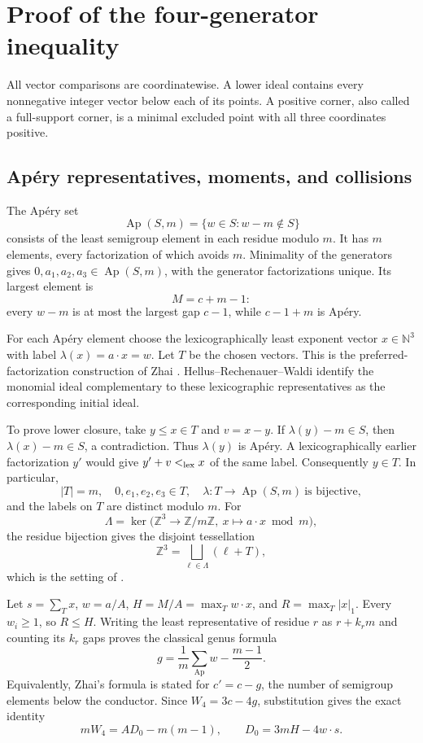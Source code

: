 \section{Proof of the four-generator inequality}\label{sec:proof}

All vector comparisons are coordinatewise. A lower ideal contains every
nonnegative integer vector below each of its points. A positive corner,
also called a full-support corner, is a minimal excluded point with all
three coordinates positive.

\subsection{Apéry representatives, moments, and collisions}\label{sec:p1}

The Apéry set
\[
\operatorname{Ap}(S,m)=\{w\in S:w-m\notin S\}
\]
consists of the least semigroup element in each residue modulo \(m\).
It has \(m\) elements, every factorization of which avoids \(m\).
Minimality of the generators gives \(0,a_1,a_2,a_3\in\operatorname{Ap}(S,m)\),
with the generator factorizations unique. Its largest element is
\[
M=c+m-1:
\]
every \(w-m\) is at most the largest gap \(c-1\), while \(c-1+m\) is Apéry.

For each Apéry element choose the lexicographically least exponent vector
\(x\in\mathbb N^3\) with label \(\lambda(x)=a\cdot x=w\).
Let \(T\) be the chosen vectors. This is the preferred-factorization
construction of Zhai \cite{Z}. Hellus--Rechenauer--Waldi
\cite[Proposition~2.3]{HRW} identify the monomial ideal complementary to
these lexicographic representatives as the corresponding initial ideal.

To prove lower closure, take \(y\le x\in T\) and \(v=x-y\).
If \(\lambda(y)-m\in S\), then \(\lambda(x)-m\in S\), a contradiction.
Thus \(\lambda(y)\) is Apéry. A lexicographically earlier factorization
\(y'\) would give \(y'+v<_{\rm lex}x\) of the same label. Consequently
\(y\in T\). In particular,
\[
|T|=m,\quad 0,e_1,e_2,e_3\in T,\quad
\lambda:T\longrightarrow\operatorname{Ap}(S,m)
\ \text{is bijective},
\]
and the labels on \(T\) are distinct modulo \(m\).
For
\[
\Lambda=\ker\bigl(\mathbb Z^3\longrightarrow\mathbb Z/m\mathbb Z,
\ x\longmapsto a\cdot x\bmod m\bigr),
\]
the residue bijection gives the disjoint tessellation
\[
\mathbb Z^3=\bigsqcup_{\ell\in\Lambda}(\ell+T),
\]
which is the setting of \cite[Proposition~2.5]{HRW}.

Let \(s=\sum_Tx\), \(w=a/A\), \(H=M/A=\max_Tw\cdot x\), and
\(R=\max_T|x|_1\). Every \(w_i\ge1\), so \(R\le H\).
Writing the least representative of residue \(r\) as \(r+k_rm\)
and counting its \(k_r\) gaps proves the classical genus formula
\[
g=\frac1m\sum_{\operatorname{Ap}}w-\frac{m-1}{2}.
\]
Equivalently, Zhai's \cite[Lemma~1]{Z} formula is stated for
\(c'=c-g\), the number of semigroup elements below the conductor.
Since \(W_4=3c-4g\), substitution gives the exact identity
\begin{equation}
\boxed{mW_4=A D_0-m(m-1),\qquad D_0=3mH-4w\cdot s.}
\label{eq:p:1}
\end{equation}


